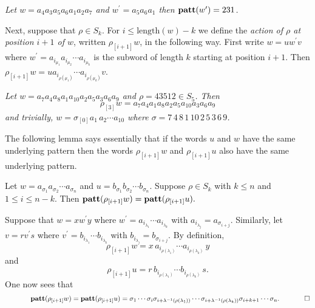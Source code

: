 \begin{example}
{\em Let $w = a_4 a_3 a_5 a_6 a_1 a_2 a_7$ and 
$w^\prime = a_5 a_6 a_1$ then ${\bf patt}(w^\prime) = 231$.}
\end{example}
 

Next, suppose that $\rho \in S_k$.  For $i\leq \mbox{length} (w)-k$ we define 
the {\em action
of $\rho$ at position $i+1$ of $w$}, written
$ \rho_{[i+1]}w$, in the following way.
First write
$w = u w^\prime v$ where 
$
w^\prime = a_{i_{\mu_1}}a_{i_{\mu_2}}\cdots a_{i_{\mu_k}}
$ is the subword of length $k$
starting at position $i+1$.
Then $ \rho_{[i+1]} w  =   u
 a_{i_{\rho(\mu_1)}} \cdots a_{i_{\rho(\mu_k)}}v$.

\begin{example} {\em Let $w = a_7 a_4 a_8 a_1 a_{10} a_2 a_5 a_3 a_6 a_9$ 
and $\rho = 43512 \in S_5$.   Then 
    $$ \rho_{[3]} w  =  a_7 a_4 a_1 a_8 a_2 a_5 a_{10} a_3 a_6 a_9 $$
and trivially,
$w  = \sigma_{[0]}a_1\,a_2\cdots a_{10}$ where
$\sigma =7\, 4\, 8\, 1\, 10\, 2\, 5\, 3\, 6\,  9$.}
\end{example}

The following lemma says essentially that if the  words $u$ and $w$ 
have the same  underlying pattern then the words 
$ \rho_{[i+1]} w $ and $ \rho_{[i+1]} u $ also have the same underlying
pattern.

\begin{lemma}\label{ugly} Let $w = a_{\sigma_1} a_{\sigma_2} \cdots a_{\sigma_n}$
and $u = b_{\sigma_1} b_{\sigma_2} \cdots b_{\sigma_n}$.
Suppose $\rho \in S_k$ with $k \le n$ and $1 \le i \le n-k$.
Then ${\bf patt}( \rho_{[i+1]} w ) = {\bf patt}( \rho_{[i+1]}  u).$
\end{lemma}
Suppose that $w = x w^\prime y$ where
$w^\prime = a_{i_{\lambda_1}}\cdots a_{i_{\lambda_k}}$ 
with $a_{i_{\lambda_j}}= a_{\sigma_{i+j}}$.
Similarly, let $v = r v^\prime s$ where $v^\prime = b_{i_{\lambda_1}}\cdots b_{i_{\lambda_k}}$ 
with $b_{i_{\lambda_j}}= b_{\sigma_{i+j}}$.
By definition,
$$
 \rho_{[i+1]} w  =x \,a_{i_{\rho({\lambda_1})}}\cdots a_{i_{\rho({\lambda_k})}} \,y
$$
and 
$$
 \rho_{[i+1]} u  =  r\,b_{i_{\rho({\lambda_1})}}\cdots b_{i_{\rho({\lambda_k})}}\,s.
$$
One now sees that 
$$\hspace*{1.27cm}{\bf patt}( \rho_{[i+1]} w ) = {\bf patt}( \rho_{[i+1]}u)=
\sigma_1\cdots \sigma_i \sigma_{i +\lambda^{-1}(\rho(\lambda_1))}\cdots \sigma_{i+\lambda^{-1}(\rho(\lambda_k))}
\sigma_{i+k+1}\cdots \sigma_n.\hspace*{1.27cm}\Box$$

